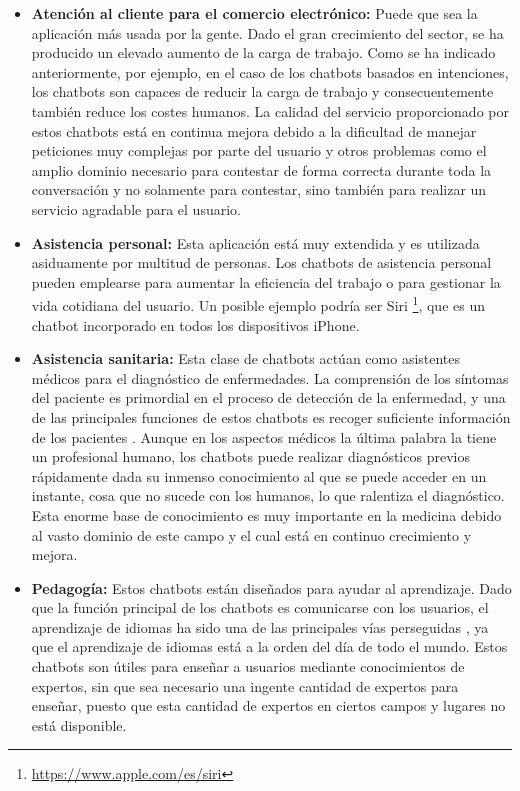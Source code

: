 \begin{itemize}
\item \textbf{Atención al cliente para el comercio electrónico:} Puede que sea la aplicación más usada por la gente. Dado el gran crecimiento del sector, se ha producido un elevado aumento de la carga de trabajo. Como se ha indicado anteriormente, por ejemplo, en el caso de los chatbots basados en intenciones, los chatbots son capaces de reducir la carga de trabajo y consecuentemente también reduce los costes humanos. La calidad del servicio proporcionado por estos chatbots está en continua mejora debido a la dificultad de manejar peticiones muy complejas por parte del usuario y otros problemas como el amplio dominio necesario para contestar de forma correcta durante toda la conversación y no solamente para contestar, sino también para realizar un servicio agradable para el usuario.
\item \textbf{Asistencia personal:} Esta aplicación está muy extendida y es utilizada asiduamente por multitud de personas. Los chatbots de asistencia personal pueden emplearse para aumentar la eficiencia del trabajo o para gestionar la vida cotidiana del usuario. Un posible ejemplo podría ser Siri \footnote{\url{https://www.apple.com/es/siri}}, que es un chatbot incorporado en todos los dispositivos iPhone.
\item \textbf{Asistencia sanitaria:} Esta clase de chatbots actúan como asistentes médicos para el diagnóstico de enfermedades. La comprensión de los síntomas del paciente es primordial en el proceso de detección de la enfermedad, y una de las principales funciones de estos chatbots es recoger suficiente información de los pacientes \cite{RefWorks:RefID:36-luo2022critical}. Aunque en los aspectos médicos la última palabra la tiene un profesional humano, los chatbots puede realizar diagnósticos previos rápidamente dada su inmenso conocimiento al que se puede acceder en un instante, cosa que no sucede con los humanos, lo que ralentiza el diagnóstico. Esta enorme base de conocimiento es muy importante en la medicina debido al vasto dominio de este campo y el cual está en continuo crecimiento y mejora.
\item \textbf{Pedagogía:} Estos chatbots están diseñados para ayudar al aprendizaje. Dado que la función principal de los chatbots es comunicarse con los usuarios, el aprendizaje de idiomas ha sido una de las principales vías perseguidas \cite{RefWorks:RefID:36-luo2022critical}, ya que el aprendizaje de idiomas está a la orden del día de todo el mundo. Estos chatbots son útiles para enseñar a usuarios mediante conocimientos de expertos, sin que sea necesario una ingente cantidad de expertos para enseñar, puesto que esta cantidad de expertos en ciertos campos y lugares no está disponible.
\end{itemize}

